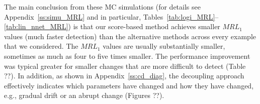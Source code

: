 \documentclass[twoside,11pt]{article}
\begin{document}
The main conclusion from these MC simulations (for details see Appendix~\ref{ss:simu_MRL} and in particular, Tables~\ref{tab:logi_MRL}--\ref{tab:lin_nnet_MRL}) is that our score-based method achieves smaller $MRL_1$ values (much faster detection) than the alternative methods across every example that we considered. The $MRL_1$ values are usually substantially smaller, sometimes as much as four to five times smaller. The performance improvement was typical greater for smaller changes that are more difficult to detect (Table ??). In addition, as shown in Appendix~\ref{ss:cd_diag}, the decoupling approach effectively indicates which parameters have changed and how they have changed, e.g., gradual drift or an abrupt change (Figures ??). %
\end{document}
